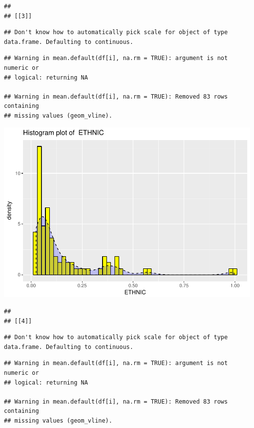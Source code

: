 \documentclass[]{article}
\begin{document}
\begin{verbatim}
## 
## [[3]]
\end{verbatim}

\begin{verbatim}
## Don't know how to automatically pick scale for object of type data.frame. Defaulting to continuous.
\end{verbatim}

\begin{verbatim}
## Warning in mean.default(df[i], na.rm = TRUE): argument is not numeric or
## logical: returning NA

## Warning in mean.default(df[i], na.rm = TRUE): Removed 83 rows containing
## missing values (geom_vline).
\end{verbatim}

\includegraphics{Desc_stats_files/figure-latex/unnamed-chunk-2-3.pdf}

\begin{verbatim}
## 
## [[4]]
\end{verbatim}

\begin{verbatim}
## Don't know how to automatically pick scale for object of type data.frame. Defaulting to continuous.
\end{verbatim}

\begin{verbatim}
## Warning in mean.default(df[i], na.rm = TRUE): argument is not numeric or
## logical: returning NA

## Warning in mean.default(df[i], na.rm = TRUE): Removed 83 rows containing
## missing values (geom_vline).
\end{verbatim}
\end{document}
